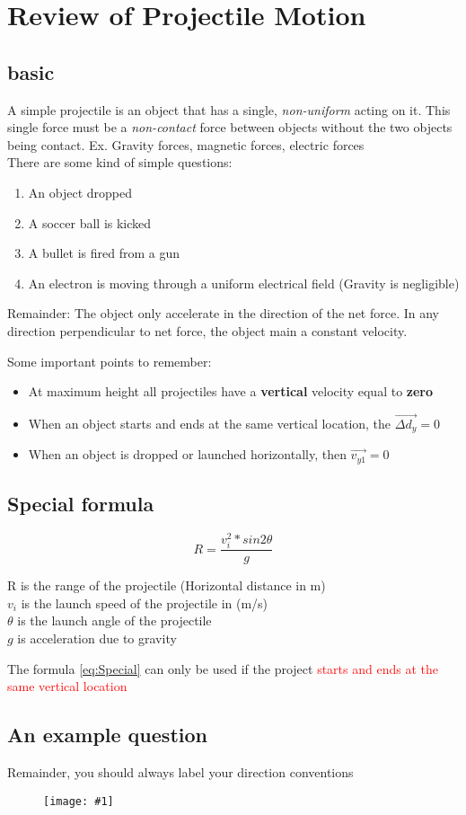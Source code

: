 \documentclass[11pt]{report}
\theoremstyle{remark}
\newcommand{\mypic}[3]{
    \begin{figure}[h!]
        \centering
        \texttt{[image: \#1]}
        \caption{#2}
    \end{figure}
}
\begin{document}
\section{Review of Projectile Motion}
\subsection{basic}
A simple projectile is an object that has a single, \textit{non-uniform} acting on it. This single force must be a 
\textit{non-contact} force between objects without the two objects being contact. Ex. Gravity forces, magnetic forces,
electric forces \\

There are some kind of simple questions:
\begin{enumerate}
    \item An object dropped
    \item A soccer ball is kicked
    \item A bullet is fired from a gun 
    \item An electron is moving through a uniform electrical field (Gravity is negligible)
\end{enumerate}

Remainder: The object only accelerate in the direction of the net force. In any direction perpendicular to net force, 
the object main a constant velocity. 

Some important points to remember:
\begin{itemize}
    \item At maximum height all projectiles have a \textbf{vertical} velocity equal to \textbf{zero}
    \item When an object starts and ends at the same vertical location, the $\vec{\Delta d_{y}} = 0$
    \item When an object is dropped or launched horizontally, then $\vec{v_{y1}} = 0$
\end{itemize}

\subsection{Special formula}
\begin{equation} \label{eq:Special}
    R = \frac{ v_{i}^2 * sin{2\theta} }{g} 
\end{equation}
\begin{center}
    R is the range of the projectile (Horizontal distance in m) \\
    $v_{i}$ is the launch speed of the projectile in (m/s) \\
    $\theta$ is the launch angle of the projectile \\
    $g$ is acceleration due to gravity \\
\end{center}

The formula \ref{eq:Special} can only be used if the project \textcolor{red}{starts and ends at the same vertical location}
\newpage
\subsection{An example question}
Remainder, you should always label your direction conventions

\mypic{graph/projectileReview.png}{}{0.7}
\end{document}

